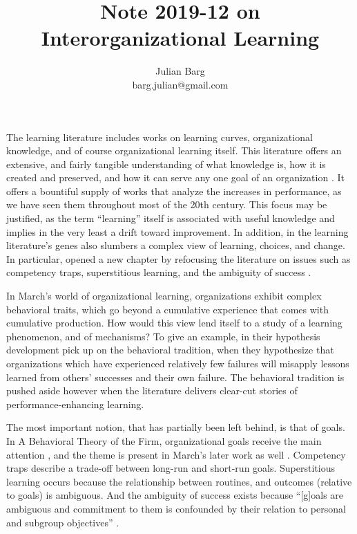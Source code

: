 \documentclass[12pt, man, natbib]{apa6}
\title{Note 2019-12 on Interorganizational Learning}
\author{Julian Barg\\barg.julian@gmail.com}
\affiliation{Ivey Business School}
\begin{document}
	
\maketitle

\singlespacing

\section{}	
	The learning literature includes works on learning curves, organizational knowledge, and of course organizational learning itself. This literature offers an extensive, and fairly tangible understanding of what knowledge is, how it is created and preserved, and how it can serve any one goal of an organization \citep{Argote2013}. It offers a bountiful supply of works that analyze the increases in performance, as we have seen them throughout most of the 20th century. This focus may be justified, as the term “learning” itself is associated with useful knowledge and implies in the very least a drift toward improvement. In addition, in the learning literature’s genes also slumbers a complex view of learning, choices, and change. In particular, \citet{Levitt1988} opened a new chapter by refocusing the literature on issues such as competency traps, superstitious learning, and the ambiguity of success .
	
	In March’s world of organizational learning, organizations exhibit complex behavioral traits, which go beyond a cumulative experience that comes with cumulative production. How would this view lend itself to a study of a learning phenomenon, and of mechanisms? To give an example, \citet{Madsen2010} in their hypothesis development pick up on the behavioral tradition, when they hypothesize that organizations which have experienced relatively few failures will misapply lessons learned from others’ successes and their own failure. The behavioral tradition is pushed aside however when the literature delivers clear-cut stories of performance-enhancing learning.
	
	The most important notion, that has partially been left behind, is that of goals. In A Behavioral Theory of the Firm, organizational goals receive the main attention \citep[see][]{Cyert1992-2}, and the theme is present in March’s later work as well \citep[especially][]{Levitt1988}. Competency traps describe a trade-off between long-run and short-run goals. Superstitious learning occurs because the relationship between routines, and outcomes (relative to goals) is ambiguous. And the ambiguity of success exists because “[g]oals are ambiguous and commitment to them is confounded by their relation to personal and subgroup objectives” \citep[p. 325]{Levitt1988}. 
	
\end{document}
